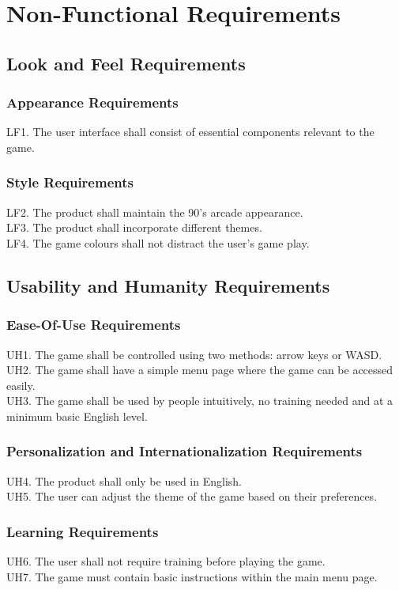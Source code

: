\documentclass[12pt]{article}
\begin{document}
\section{Non-Functional Requirements}
    \subsection{Look and Feel Requirements}
        \subsubsection{Appearance Requirements}
        LF1. The user interface shall consist of essential components relevant to the game.
        \subsubsection{Style Requirements} 
    	LF2. The product shall maintain the 90's arcade appearance.\\
    	LF3. The product shall incorporate different themes.\\
    	LF4. The game colours shall not distract the user's game play.
   
\subsection{Usability and Humanity Requirements}
    \subsubsection{Ease-Of-Use Requirements}
    UH1. The game shall be controlled using two methods: arrow keys or WASD.\\
    UH2. The game shall have a simple menu page where the game can be accessed easily.\\
    UH3. The game shall be used by people intuitively, no training needed and at a minimum basic English level.
    
    \subsubsection{Personalization and Internationalization Requirements}
    UH4. The product shall only be used in English.\\
    UH5. The user can adjust the theme of the game based on their preferences.
    
    \subsubsection{Learning Requirements}
    UH6. The user shall not require training before playing the game.\\
    UH7. The game must contain basic instructions within the main menu page.
\end{document}
